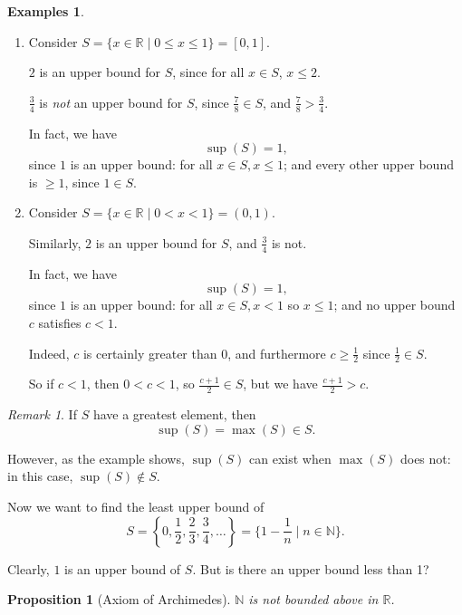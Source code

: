 \documentclass{article}
\newtheorem{proposition}[theorem]{Proposition}
\theoremstyle{definition}
\newtheorem{examples}[theorem]{Examples}
\theoremstyle{remark}
\newtheorem{remark}[theorem]{Remark}
\newcommand{\pqty}[1]{\left(#1\right)}
\newcommand{\Bqty}[1]{\left\{#1\right\}}
\newcommand{\set}[2]{\{#1\mid #2\}}
\newcommand{\ccintv}[2]{[#1,#2]}
\newcommand{\oointv}[2]{(#1,#2)}
\newcommand{\NN}{\mathbb{N}}
\newcommand{\RR}{\mathbb{R}}
\begin{document}
\begin{examples}
    \begin{enumerate}
        \item Consider \(S = \set{x \in \RR}{0 \leq x \leq 1} = \ccintv{0}{1}\).
        
        \(2\) is an upper bound for \(S\), since for all \(x \in S\), \(x \leq 2\).

        \(\frac{3}{4}\) is \emph{not} an upper bound for \(S\), since \(\frac{7}{8} \in S\), and \(\frac{7}{8} > \frac{3}{4}\).

        In fact, we have
        \[
            \sup \pqty{S} = 1,
        \]
        since \(1\) is an upper bound: for all \(x \in S, x \leq 1\); and every other upper bound is \(\geq 1\), since \(1 \in S\).

        \item Consider \(S = \set{x \in \RR}{0 < x < 1} = \oointv{0}{1}\).
        
        Similarly, \(2\) is an upper bound for \(S\), and \(\frac{3}{4}\) is not.

        In fact, we have
        \[
            \sup \pqty{S} = 1,
        \]
        since \(1\) is an upper bound: for all \(x \in S, x < 1\) so \(x \leq 1\); and no upper bound \(c\) satisfies \(c < 1\).

        Indeed, \(c\) is certainly greater than \(0\), and furthermore \(c \geq \frac{1}{2}\) since \(\frac{1}{2} \in S\).

        So if \(c < 1\), then \(0 < c < 1\), so \(\frac{c + 1}{2} \in S\), but we have \(\frac{c + 1}{2} > c\).
    \end{enumerate}
\end{examples}

\begin{remark}
    If \(S\) have a greatest element, then
    \[
        \sup \pqty{S} = \max \pqty{S} \in S.
    \]

    However, as the example shows, \(\sup\pqty{S}\) can exist when \(\max\pqty{S}\) does not: in this case, \(\sup\pqty{S} \notin S\).
\end{remark}

Now we want to find the least upper bound of
\[
    S = \Bqty{0, \frac{1}{2}, \frac{2}{3}, \frac{3}{4}, \ldots} = \set{1 - \frac{1}{n}}{n \in \NN}.
\]

Clearly, \(1\) is an upper bound of \(S\). But is there an upper bound less than 1?

\begin{proposition}[Axiom of Archimedes]
    \(\NN\) is not bounded above in \(\RR\).
\end{proposition}
\end{document}
